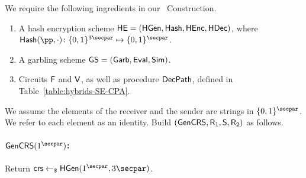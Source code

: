 \begin{construction}\label{Const:LPSIGarb}
   We require the following ingredients in our \ePSI~Construction. %
\begin{enumerate}
    \item A  hash encryption scheme $\mathsf{HE} = (\mathsf{HGen}, \mathsf{Hash}, \mathsf{HEnc}, \mathsf{HDec})$, where $\Hash(\pp, \cdot) \colon \bits^{3 \secpar} \mapsto \bits^\secpar$. %
    \item A garbling scheme $\mathsf{GS} = (\mathsf{Garb}, \mathsf{Eval}, \mathsf{Sim})$. %
    \item Circuits $\mathsf{F}$ and $\mathsf{V}$, as well as procedure $\mathsf{DecPath}$, defined in Table~\ref{table:hybrids-SE-CPA}.
\end{enumerate}
We assume the elements of the receiver and the sender are strings in $\bits^\secpar$. We refer to each element as an identity. Build $(\mathsf{GenCRS} , \mathsf{R}_1 ,  \mathsf{S}, \mathsf{R}_2)$ as follows.
   
\paragraph{$\gencrs(1^\secpar)$:}   Return $\crs \pick \HGen(1^\secpar,  3 \secpar)$.
       

\end{construction}
